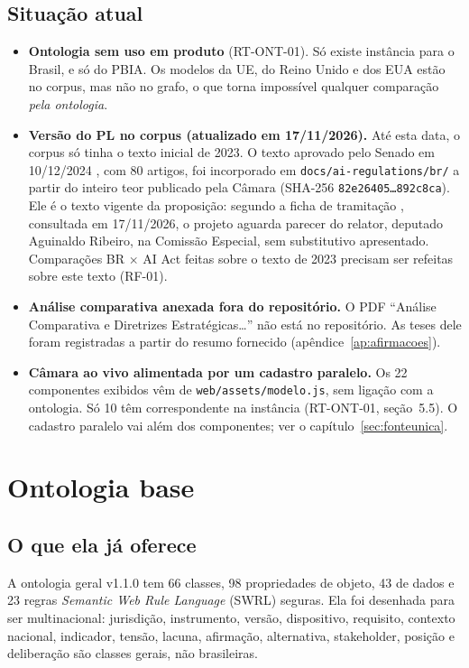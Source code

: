 \documentclass[12pt,a4paper,oneside,english,brazil]{abntex2}
\begin{document}
\section{Situação atual}
\begin{itemize}[leftmargin=*]
  \item \textbf{Ontologia sem uso em produto} (RT-ONT-01). Só existe instância para o Brasil, e só do PBIA. Os modelos da UE, do Reino Unido e dos EUA estão no corpus, mas não no grafo, o que torna impossível qualquer comparação \emph{pela ontologia}.
  \item \textbf{Versão do PL no corpus (atualizado em 17/11/2026).} Até esta data, o corpus só tinha o texto inicial de 2023. O texto aprovado pelo Senado em 10/12/2024 \cite{pl2338-2024}, com 80 artigos, foi incorporado em \texttt{docs/ai-regulations/br/} a partir do inteiro teor publicado pela Câmara (SHA-256 \texttt{82e26405\ldots 892c8ca}). Ele é o texto vigente da proposição: segundo a ficha de tramitação \cite{camara-pl2338}, consultada em 17/11/2026, o projeto aguarda parecer do relator, deputado Aguinaldo Ribeiro, na Comissão Especial, sem substitutivo apresentado. Comparações BR $\times$ AI Act feitas sobre o texto de 2023 precisam ser refeitas sobre este texto (RF-01).
  \item \textbf{Análise comparativa anexada fora do repositório.} O PDF ``Análise Comparativa e Diretrizes Estratégicas\ldots'' \cite{estudo-comparativo} não está no repositório. As teses dele foram registradas a partir do resumo fornecido (apêndice~\ref{ap:afirmacoes}).
  \item \textbf{Câmara ao vivo alimentada por um cadastro paralelo.} Os 22 componentes exibidos vêm de \texttt{web/assets/modelo.js}, sem ligação com a ontologia. Só 10 têm correspondente na instância (RT-ONT-01, seção~5.5). O cadastro paralelo vai além dos componentes; ver o capítulo~\ref{sec:fonteunica}.
\end{itemize}

\chapter{Ontologia base}\label{cap:base}

\section{O que ela já oferece}
A ontologia geral v1.1.0 tem 66 classes, 98 propriedades de objeto, 43 de dados e 23 regras \emph{Semantic Web Rule Language} (SWRL) seguras. Ela foi desenhada para ser multinacional: jurisdição, instrumento, versão, dispositivo, requisito, contexto nacional, indicador, tensão, lacuna, afirmação, alternativa, stakeholder, posição e deliberação são classes gerais, não brasileiras.
\end{document}
